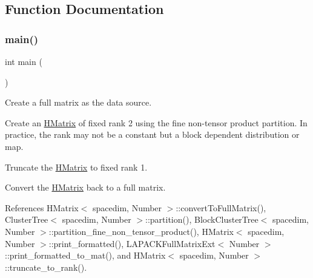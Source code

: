 \subsection{Function Documentation}
\mbox{\label{hmatrix-truncate-to-fixed-rank_8cc_ae66f6b31b5ad750f1fe042a706a4e3d4}} 
\subsubsection{\texorpdfstring{main()}{main()}}
{\footnotesize\ttfamily int main (\begin{DoxyParamCaption}{ }\end{DoxyParamCaption})}

Create a full matrix as the data source.

Create an \hyperlink{classHMatrix}{H\+Matrix} of fixed rank 2 using the fine non-\/tensor product partition. In practice, the rank may not be a constant but a block dependent distribution or map.

Truncate the \hyperlink{classHMatrix}{H\+Matrix} to fixed rank 1.

Convert the \hyperlink{classHMatrix}{H\+Matrix} back to a full matrix.

References H\+Matrix$<$ spacedim, Number $>$\+::convert\+To\+Full\+Matrix(), Cluster\+Tree$<$ spacedim, Number $>$\+::partition(), Block\+Cluster\+Tree$<$ spacedim, Number $>$\+::partition\+\_\+fine\+\_\+non\+\_\+tensor\+\_\+product(), H\+Matrix$<$ spacedim, Number $>$\+::print\+\_\+formatted(), L\+A\+P\+A\+C\+K\+Full\+Matrix\+Ext$<$ Number $>$\+::print\+\_\+formatted\+\_\+to\+\_\+mat(), and H\+Matrix$<$ spacedim, Number $>$\+::truncate\+\_\+to\+\_\+rank().

